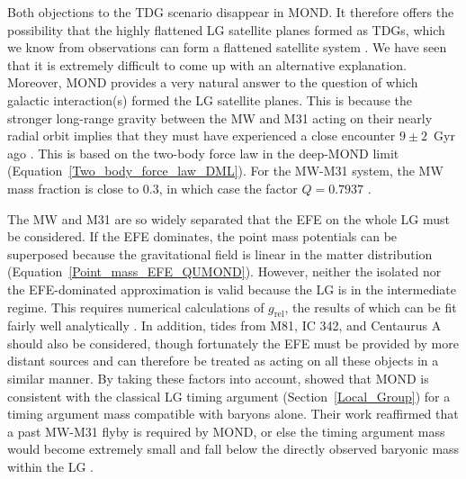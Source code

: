 \documentclass[fleqn,usenatbib,useAMS,onecolumn]{mnras} %
\begin{document}
Both objections to the TDG scenario disappear in MOND. It therefore offers the possibility that the highly flattened LG satellite planes formed as TDGs, which we know from observations can form a flattened satellite system \citep{Mirabel_1992, Bournaud_2004}. We have seen that it is extremely difficult to come up with an alternative explanation. Moreover, MOND provides a very natural answer to the question of which galactic interaction(s) formed the LG satellite planes. This is because the stronger long-range gravity between the MW and M31 acting on their nearly radial orbit \citep{Van_der_Marel_2012, Van_der_Marel_2019, Salomon_2021} implies that they must have experienced a close encounter $9 \pm 2$~Gyr ago \citep{Zhao_2013}. This is based on the two-body force law in the deep-MOND limit (Equation~\ref{Two_body_force_law_DML}). For the MW-M31 system, the MW mass fraction is close to 0.3, in which case the factor $Q = 0.7937$ \citep{Banik_Ryan_2018}.

The MW and M31 are so widely separated that the EFE on the whole LG must be considered. If the EFE dominates, the point mass potentials can be superposed because the gravitational field is linear in the matter distribution (Equation~\ref{Point_mass_EFE_QUMOND}). However, neither the isolated nor the EFE-dominated approximation is valid because the LG is in the intermediate regime. This requires numerical calculations of $g_\text{rel}$, the results of which can be fit fairly well analytically \citep{Banik_Ryan_2018}. In addition, tides from M81, IC 342, and Centaurus A should also be considered, though fortunately the EFE must be provided by more distant sources and can therefore be treated as acting on all these objects in a similar manner. By taking these factors into account, \citet{Banik_Ryan_2018} showed that MOND is consistent with the classical LG timing argument (Section~\ref{Local_Group}) for a timing argument mass compatible with baryons alone. Their work reaffirmed that a past MW-M31 flyby is required by MOND, or else the timing argument mass would become extremely small and fall below the directly observed baryonic mass within the LG \citep[see also][]{Benisty_2020, McLeod_2020}.
\end{document}
